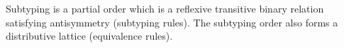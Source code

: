 Subtyping is a partial order which is a reflexive transitive binary relation satisfying antisymmetry (subtyping rules). The subtyping order also forms a distributive lattice (equivalence rules). 

